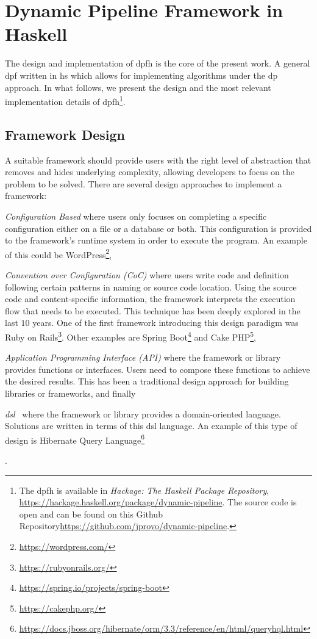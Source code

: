 \section{Dynamic Pipeline Framework in Haskell}\label{dp-hs}
The design and implementation of \acrfull{dpfh} is the core of the present work. A general \acrlong{dpf} written in \acrlong{hs} which allows for implementing algorithms under the \acrlong{dp} approach. In what follows, we present the design and the  most relevant implementation details of \acrshort{dpfh}\footnote{The \acrshort{dpfh} is available in \textit{Hackage: The Haskell Package Repository}, \url{https://hackage.haskell.org/package/dynamic-pipeline}. The source code is open and can be found on this Github Repository\url{https://github.com/jproyo/dynamic-pipeline}.
}.

\subsection{Framework Design}
A suitable framework should provide users with the right level of abstraction that removes and hides underlying complexity, 
allowing developers to focus on the problem to be solved. There are several design approaches to implement a framework: \begin{inparaenum}[i\upshape)]
  \item  \emph{Configuration Based} where users only focuses on completing a specific configuration either on a file or a database or both. This configuration is provided to the framework's runtime system in order to execute the program. An example of this could be WordPress\footnote{\url{https://wordpress.com/}}, 
  \item  \emph{Convention over Configuration (CoC)} where users write code and definition following certain patterns in naming or source code location. Using the source code and content-specific information, the framework interprets the execution flow that needs to be executed. This technique has been deeply explored in the last $10$ years. One of the first framework introducing this design paradigm was Ruby on Rails\footnote{\url{https://rubyonrails.org/}}. Other examples are Spring Boot\footnote{\url{https://spring.io/projects/spring-boot}} and Cake PHP\footnote{\url{https://cakephp.org/}},
  \item \emph{Application Programming Interface (API)} where the framework or library provides functions or interfaces. Users need to compose these functions to achieve the desired results. This has been a traditional design approach for building  libraries or frameworks, and finally
  \item \emph{\acrfull{dsl}}~\cite{Fowler10} where the framework or library provides a domain-oriented language. Solutions are written in terms of this \acrshort{dsl} language. An example of this type of design is Hibernate Query Language\footnote{\url{https://docs.jboss.org/hibernate/orm/3.3/reference/en/html/queryhql.html}}
   \end{inparaenum}.

